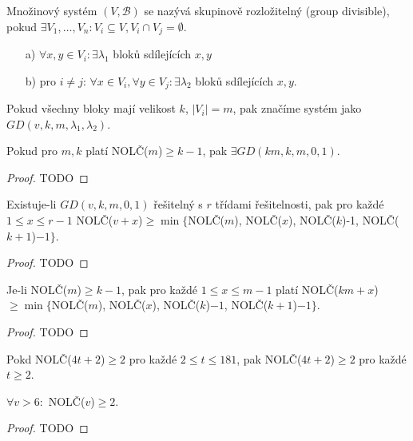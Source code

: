 \begin{definition}
    Množinový systém $(V,\mathcal{B})$ se nazývá skupinově rozložitelný (group divisible), pokud $\exists V_1,\ldots, V_n: V_i\subseteq V, V_i\cap V_j=\emptyset$.
    \begin{itemize}
        \item[a)] $\forall x,y\in V_i: \exists \lambda_1$ bloků sdílejících $x,y$
        \item[b)] pro $i\neq j$: $\forall x\in V_i, \forall y\in V_j: \exists\lambda_2$ bloků sdílejících $x,y$.
    \end{itemize}
    Pokud všechny bloky mají velikost $k$, $|V_i|=m$, pak značíme systém jako $GD(v,k,m,\lambda_1,\lambda_2)$.
\end{definition}
\begin{theorem}
    Pokud pro $m,k$ platí NOLČ($m$)$\geq k-1$, pak $\exists GD(km,k,m,0,1)$.
\end{theorem}
\begin{proof}
    TODO
\end{proof}
\begin{theorem}
    Existuje-li $GD(v,k,m,0,1)$ řešitelný s $r$ třídami řešitelnosti, pak pro každé $1\leq x\leq r-1$ NOLČ($v+x$)$\geq\min\{$NOLČ($m$), NOLČ($x$), NOLČ($k$)-1, NOLČ($k+1$)$-1\}$.
\end{theorem}
\begin{proof}
    TODO
\end{proof}
\begin{consequence}
    Je-li NOLČ($m$)$\geq k-1$, pak pro každé $1\leq x\leq m-1$ platí NOLČ($km+x$)$\geq\min\{$NOLČ($m$), NOLČ($x$), NOLČ($k$)$-1$, NOLČ($k+1$)$-1\}$.
\end{consequence}
\begin{proof}
    TODO
\end{proof}
\begin{lemma}
    Pokd NOLČ($4t+2$)$\geq 2$ pro každé $2\leq t\leq 181$, pak NOLČ($4t+2$)$\geq 2$ pro každé $t\geq 2$.
\end{lemma}
\begin{theorem}
    $\forall v>6:$ NOLČ($v$)$\geq 2$.
\end{theorem}
\begin{proof}
    TODO
\end{proof}
